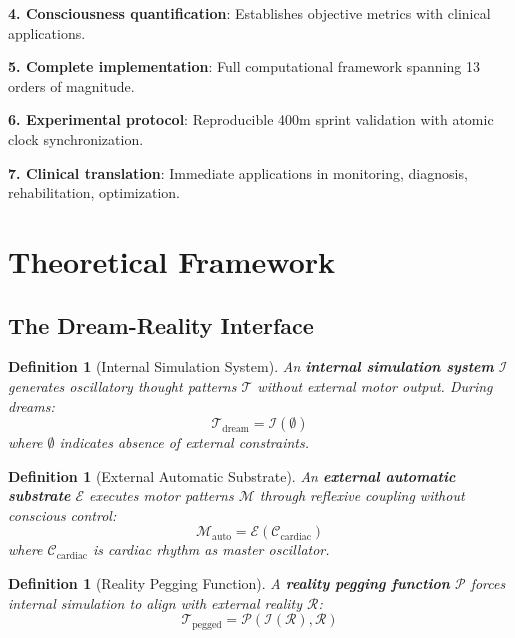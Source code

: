 \documentclass[12pt,twocolumn]{article}
\newtheorem{definition}[theorem]{Definition}
\theoremstyle{remark}
\begin{document}
\textbf{4. Consciousness quantification}: Establishes objective metrics with clinical applications.

\textbf{5. Complete implementation}: Full computational framework spanning 13 orders of magnitude.

\textbf{6. Experimental protocol}: Reproducible 400m sprint validation with atomic clock synchronization.

\textbf{7. Clinical translation}: Immediate applications in monitoring, diagnosis, rehabilitation, optimization.

\section{Theoretical Framework}

\subsection{The Dream-Reality Interface}

\begin{definition}[Internal Simulation System]
An \textbf{internal simulation system} $\mathcal{I}$ generates oscillatory thought patterns $\mathcal{T}$ without external motor output. During dreams:
\begin{equation}
\mathcal{T}_{\text{dream}} = \mathcal{I}(\emptyset)
\end{equation}
where $\emptyset$ indicates absence of external constraints.
\end{definition}

\begin{definition}[External Automatic Substrate]
An \textbf{external automatic substrate} $\mathcal{E}$ executes motor patterns $\mathcal{M}$ through reflexive coupling without conscious control:
\begin{equation}
\mathcal{M}_{\text{auto}} = \mathcal{E}(\mathcal{C}_{\text{cardiac}})
\end{equation}
where $\mathcal{C}_{\text{cardiac}}$ is cardiac rhythm as master oscillator.
\end{definition}

\begin{definition}[Reality Pegging Function]
A \textbf{reality pegging function} $\mathcal{P}$ forces internal simulation to align with external reality $\mathcal{R}$:
\begin{equation}
\mathcal{T}_{\text{pegged}} = \mathcal{P}(\mathcal{I}(\mathcal{R}), \mathcal{R})
\end{equation}
\end{definition}
\end{document}
